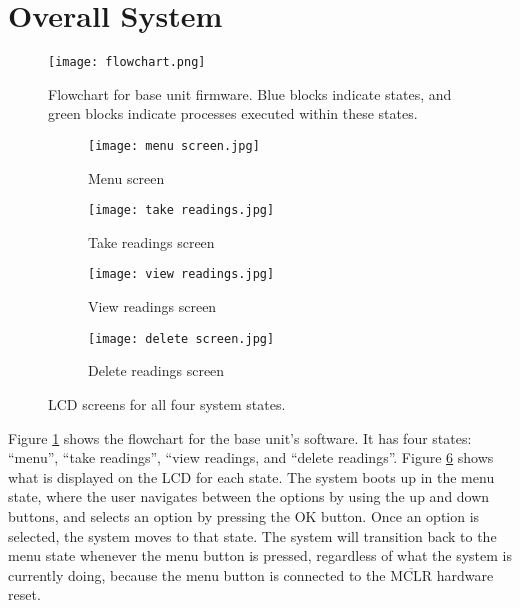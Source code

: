 \section{Overall System}
\begin{figure}[htbp]
	\centering
	\texttt{[image: flowchart.png]}
	\caption{Flowchart for base unit firmware. Blue blocks indicate states, and green blocks indicate processes executed within these states.}
	\label{fig: flowchart}
\end{figure}

\begin{figure}[htbp]
	\centering
	\begin{subfigure}[b]{0.4\linewidth}
		\texttt{[image: menu screen.jpg]}
		\caption{Menu screen}
		\label{fig: menu screen}
	\end{subfigure}
	\begin{subfigure}[b]{0.4\linewidth}
		\texttt{[image: take readings.jpg]}
		\caption{Take readings screen}
		\label{fig: take readings screen}
	\end{subfigure}
	\begin{subfigure}[b]{0.4\linewidth}
		\texttt{[image: view readings.jpg]}
		\caption{View readings screen}
		\label{fig: view readings screen}
	\end{subfigure}
	\begin{subfigure}[b]{0.4\linewidth}
		\texttt{[image: delete screen.jpg]}
		\caption{Delete readings screen}
		\label{fig: delete readings screen}
	\end{subfigure}
	\caption{LCD screens for all four system states.}
	\label{fig: lcd screens}
\end{figure}

Figure \ref{fig: flowchart} shows the flowchart for the base unit's software. It has four states: ``menu'', ``take readings'', ``view readings, and ``delete readings''. Figure \ref{fig: lcd screens} shows what is displayed on the LCD for each state. The system boots up in the menu state, where the user navigates between the options by using the up and down buttons, and selects an option by pressing the OK button. Once an option is selected, the system moves to that state. The system will transition back to the menu state whenever the menu button is pressed, regardless of what the system is currently doing, because the menu button is connected to the $\overline{\text{MCLR}}$ hardware reset.\\

